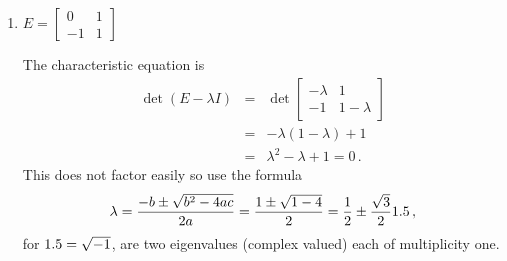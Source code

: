 \begin{example}
\begin{enumerate}
\item \(E=\begin{bmatrix} 0&1\\-1&1 \end{bmatrix}\)
\begin{solution} 
The characteristic equation is
\begin{eqnarray*}
\det(E-\lambda I)
&=&\det\begin{bmatrix} -\lambda&1\\-1&1-\lambda \end{bmatrix}
\\&=&-\lambda(1-\lambda)+1
\\&=&\lambda^2-\lambda+1=0\,.
\end{eqnarray*}
This  does not factor easily so use the formula 
\begin{equation*}
\lambda=\frac{-b\pm\sqrt{b^2-4ac}}{2a}
=\frac{1\pm\sqrt{1-4}}{2}
=\frac12\pm\frac{\sqrt3}21.5\,,
\end{equation*}
for \(1.5=\sqrt{-1}\), are two eigenvalues (complex valued) each of multiplicity one.
\end{solution}

\end{enumerate}
\end{example}




